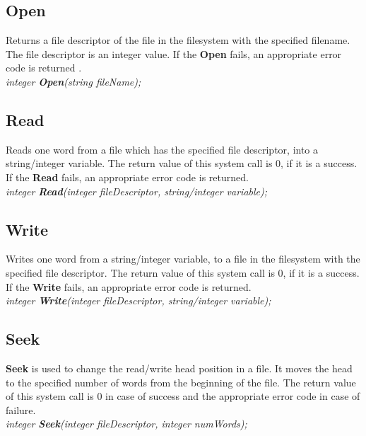 \documentclass[11pt]{article}
\begin{document}
\subsection{Open}
Returns a file descriptor of the file in the filesystem with the specified filename. The file descriptor is an integer value. If the \textbf{Open} fails, an appropriate error code is returned
.\\

\textit{integer \textbf{Open}(string fileName);}





\subsection{Read}
Reads one word from a file which has the specified file descriptor, into a string/integer variable. The return value of this system call is 0, if it is a success. If the \textbf{Read} fails, an appropriate error code is returned.\\

\textit{integer \textbf{Read}(integer fileDescriptor, string/integer variable);}





\subsection{Write}
Writes one word from a string/integer variable, to a file in the filesystem with the specified file descriptor. The return value of this system call is 0, if it is a success. If the \textbf{Write} fails, an appropriate error code is returned.\\

\textit{integer \textbf{Write}(integer fileDescriptor, string/integer variable);}





\subsection{Seek}
\textbf{Seek} is used to change the read/write head position in a file. It moves the head to the specified number of words from the beginning of the file. The return value of this system call is 0 in case of success and the appropriate error code in case of failure.\\

\textit{integer \textbf{Seek}(integer fileDescriptor, integer numWords);}
 
\end{document}
